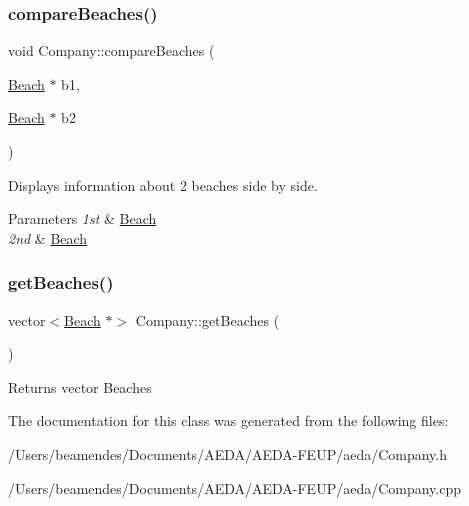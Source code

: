 \subsubsection{\texorpdfstring{compare\+Beaches()}{compareBeaches()}}
{\footnotesize\ttfamily void Company\+::compare\+Beaches (\begin{DoxyParamCaption}\item[{\hyperlink{class_beach}{Beach} $\ast$}]{b1,  }\item[{\hyperlink{class_beach}{Beach} $\ast$}]{b2 }\end{DoxyParamCaption})}



Displays information about 2 beaches side by side. 


\begin{DoxyParams}{Parameters}
{\em 1st} & \hyperlink{class_beach}{Beach} \\
\hline
{\em 2nd} & \hyperlink{class_beach}{Beach} \\
\hline
\end{DoxyParams}
\mbox{\label{class_company_a5551b69f0b6de3037f7a3a4ca4d3c48a}} 
\subsubsection{\texorpdfstring{get\+Beaches()}{getBeaches()}}
{\footnotesize\ttfamily vector$<$\hyperlink{class_beach}{Beach} $\ast$$>$ Company\+::get\+Beaches (\begin{DoxyParamCaption}{ }\end{DoxyParamCaption})\hspace{0.3cm}{\ttfamily [inline]}}

\begin{DoxyReturn}{Returns}
vector Beaches 
\end{DoxyReturn}


The documentation for this class was generated from the following files\+:\begin{DoxyCompactItemize}
\item 
/\+Users/beamendes/\+Documents/\+A\+E\+D\+A/\+A\+E\+D\+A-\/\+F\+E\+U\+P/aeda/Company.\+h\item 
/\+Users/beamendes/\+Documents/\+A\+E\+D\+A/\+A\+E\+D\+A-\/\+F\+E\+U\+P/aeda/Company.\+cpp\end{DoxyCompactItemize}
